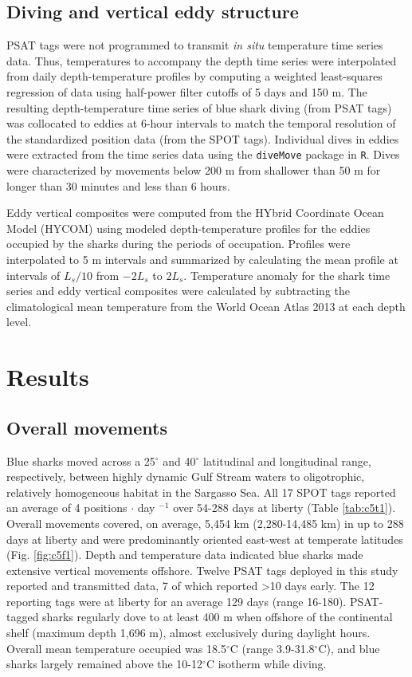 \subsection{Diving and vertical eddy structure}

PSAT tags were not programmed to transmit \textit{in situ} temperature time series data. Thus, temperatures to accompany the depth time series were interpolated from daily depth-temperature profiles by computing a weighted least-squares regression of data using half-power filter cutoffs of 5 days and 150 m. The resulting depth-temperature time series of blue shark diving (from PSAT tags) was collocated to eddies at 6-hour intervals to match the temporal resolution of the standardized position data (from the SPOT tags). Individual dives in eddies were extracted from the time series data using the \texttt{diveMove} package \citep{Luque2007} in \texttt{R}. Dives were characterized by movements below 200 m from shallower than 50 m for longer than 30 minutes and less than 6 hours.

Eddy vertical composites were computed from the HYbrid Coordinate Ocean Model (HYCOM)\citep{Chassignet2007} using modeled depth-temperature profiles for the eddies occupied by the sharks during the periods of occupation. Profiles were interpolated to 5 m intervals and summarized by calculating the mean profile at intervals of $L_s/10$ from $-2 L_s$ to $2 L_s$. Temperature anomaly for the shark time series and eddy vertical composites were calculated by subtracting the climatological mean temperature from the World Ocean Atlas 2013 \citep{Locarnini2013} at each depth level.

\section{Results}

\subsection{Overall movements}

Blue sharks moved across a 25$^{\circ}$ and 40$^{\circ}$ latitudinal and longitudinal range, respectively, between highly dynamic Gulf Stream waters to oligotrophic, relatively homogeneous habitat in the Sargasso Sea. All 17 SPOT tags reported an average of 4 positions $\cdot$ day $^{-1}$ over 54-288 days at liberty (Table \cref{tab:c5t1}). Overall movements covered, on average, 5,454 km (2,280-14,485 km) in up to 288 days at liberty and were predominantly oriented east-west at temperate latitudes (Fig. \cref{fig:c5f1}). Depth and temperature data indicated blue sharks made extensive vertical movements offshore. Twelve PSAT tags deployed in this study reported and transmitted data, 7 of which reported >10 days early. The 12 reporting tags were at liberty for an average 129 days (range 16-180). PSAT-tagged sharks regularly dove to at least 400 m when offshore of the continental shelf (maximum depth 1,696 m), almost exclusively during daylight hours. Overall mean temperature occupied was 18.5$^\circ$C (range 3.9-31.8$^\circ$C), and blue sharks largely remained above the 10-12$^\circ$C isotherm while diving.

